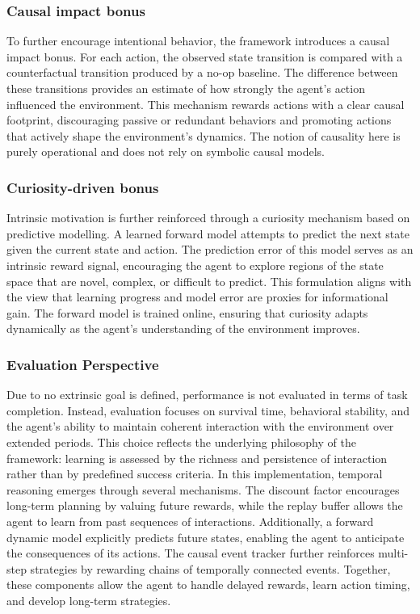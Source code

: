 \documentclass[12pt,a4paper]{report}
\begin{document}
\subsubsection{Causal impact bonus}
To further encourage intentional behavior, the framework introduces a causal impact bonus. For each action, the observed state transition is compared with a counterfactual transition produced by a no-op baseline. The difference between these transitions provides an estimate of how strongly the agent's action influenced the environment.
This mechanism rewards actions with a clear causal footprint, discouraging passive or redundant behaviors and promoting actions that actively shape the environment's dynamics. The notion of causality here is purely operational and does not rely on symbolic causal models.

\subsubsection{Curiosity-driven bonus}
Intrinsic motivation is further reinforced through a curiosity mechanism based on predictive modelling. 
A learned forward model attempts to predict the next state \cite{chiave41} given the current state and action. The prediction error of this model serves as an intrinsic reward signal, encouraging the agent to explore regions of the state space that are novel, complex, or difficult to predict.
This formulation aligns with the view that learning progress and model error are proxies for informational gain. The forward model is trained online, ensuring that curiosity adapts dynamically as the agent's understanding of the environment improves.

\subsubsection{Evaluation Perspective}
Due to no extrinsic goal is defined, performance is not evaluated in terms of task completion. Instead, evaluation focuses on survival time, behavioral stability, and the agent's ability to maintain coherent interaction with the environment over extended periods. This choice reflects the underlying philosophy of the framework: learning is assessed by the richness and persistence of interaction rather than by predefined success criteria.
In this implementation, temporal reasoning emerges through several mechanisms. The discount factor encourages long-term planning by valuing future rewards, while the replay buffer allows the agent to learn from past sequences of interactions. Additionally, a forward dynamic model explicitly predicts future states, enabling the agent to anticipate the consequences of its actions. The causal event tracker further reinforces multi-step strategies by rewarding chains of temporally connected events. Together, these components allow the agent to handle delayed rewards, learn action timing, and develop long-term strategies.
\end{document}
